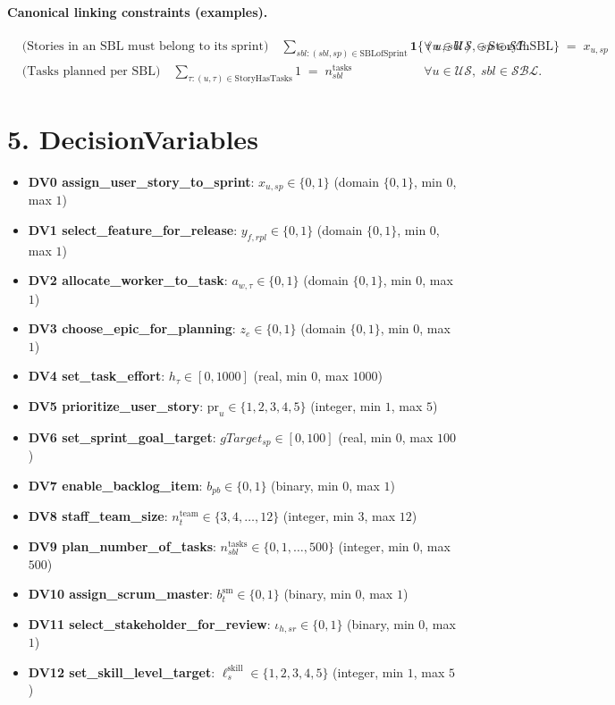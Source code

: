 \documentclass[a4paper,11pt]{article}
\begin{document}
\paragraph{Canonical linking constraints (examples).}
\begin{align*}
&\text{(Stories in an SBL must belong to its sprint)}\quad
  \sum_{sbl:(sbl,sp)\in \mathrm{SBLofSprint}} \mathbf{1}\{(u,sbl)\in \mathrm{StoryInSBL}\} \;=\; x_{u,sp} && \forall u\in\mathcal{US},\; sp\in\mathcal{SP}.\\
&\text{(Tasks planned per SBL)}\quad
  \sum_{\tau:(u,\tau)\in \mathrm{StoryHasTasks}} 1 \;=\; n^{\text{tasks}}_{sbl} && \forall u\in\mathcal{US},\; sbl\in\mathcal{SBL}.
\end{align*}

\section{5. DecisionVariables}
\begin{itemize}[leftmargin=2em]
  \item \textbf{DV0 assign\_user\_story\_to\_sprint}: $x_{u,sp}\in\{0,1\}$ \; (domain $\{0,1\}$, min $0$, max $1$)
  \item \textbf{DV1 select\_feature\_for\_release}: $y_{f,rpl}\in\{0,1\}$ \; (domain $\{0,1\}$, min $0$, max $1$)
  \item \textbf{DV2 allocate\_worker\_to\_task}: $a_{w,\tau}\in\{0,1\}$ \; (domain $\{0,1\}$, min $0$, max $1$)
  \item \textbf{DV3 choose\_epic\_for\_planning}: $z_{e}\in\{0,1\}$ \; (domain $\{0,1\}$, min $0$, max $1$)
  \item \textbf{DV4 set\_task\_effort}: $h_{\tau}\in[0,1000]$ \; (real, min $0$, max $1000$)
  \item \textbf{DV5 prioritize\_user\_story}: $\mathrm{pr}_u\in\{1,2,3,4,5\}$ \; (integer, min $1$, max $5$)
  \item \textbf{DV6 set\_sprint\_goal\_target}: $gTarget_{sp}\in[0,100]$ \; (real, min $0$, max $100$)
  \item \textbf{DV7 enable\_backlog\_item}: $b_{pb}\in\{0,1\}$ \; (binary, min $0$, max $1$)
  \item \textbf{DV8 staff\_team\_size}: $n^{\text{team}}_{t}\in\{3,4,\dots,12\}$ \; (integer, min $3$, max $12$)
  \item \textbf{DV9 plan\_number\_of\_tasks}: $n^{\text{tasks}}_{sbl}\in\{0,1,\dots,500\}$ \; (integer, min $0$, max $500$)
  \item \textbf{DV10 assign\_scrum\_master}: $b^{\text{sm}}_{t}\in\{0,1\}$ \; (binary, min $0$, max $1$)
  \item \textbf{DV11 select\_stakeholder\_for\_review}: $\iota_{h,sr}\in\{0,1\}$ \; (binary, min $0$, max $1$)
  \item \textbf{DV12 set\_skill\_level\_target}: $\ell^{\text{skill}}_{s}\in\{1,2,3,4,5\}$ \; (integer, min $1$, max $5$)
\end{itemize}
\end{document}

